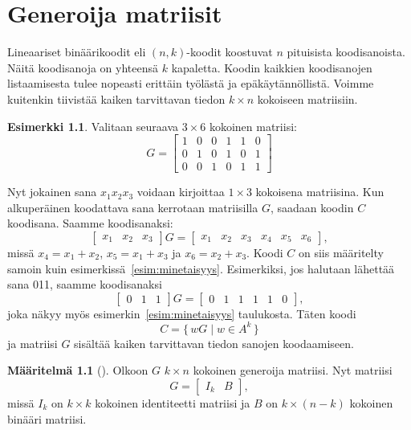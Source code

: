 \documentclass[a4paper,12pt,leqno,oneside]{report} %
\theoremstyle{plain}
\theoremstyle{definition}
\newtheorem{maaritelma}{Määritelmä}[chapter]
\newtheorem{esimerkki}{Esimerkki}[chapter]
\theoremstyle{remark}
\numberwithin{equation}{chapter}
\begin{document}
    \chapter{Generoija matriisit}
    Lineaariset binäärikoodit eli $(n,k)$-koodit koostuvat $n$ pituisista koodisanoista. Näitä koodisanoja on yhteensä $k$ kapaletta. Koodin kaikkien koodisanojen listaamisesta tulee nopeasti erittäin työlästä ja epäkäytännöllistä. Voimme kuitenkin tiivistää kaiken tarvittavan tiedon $k \times n$ kokoiseen matriisiin.

    \begin{esimerkki}\label{esim:genmatrix}
        Valitaan seuraava $3 \times 6$ kokoinen matriisi:
        \[
            G=
            \begin{bmatrix}
                1 & 0 & 0 & 1 & 1 & 0\\
                0 & 1 & 0 & 1 & 0 & 1\\
                0 & 0 & 1 & 0 & 1 & 1
            \end{bmatrix}
        \]

        Nyt jokainen sana $x_1x_2x_3$ voidaan kirjoittaa $1 \times 3$ kokoisena matriisina. Kun alkuperäinen koodattava sana kerrotaan matriisilla $G$, saadaan koodin $C$ koodisana. Saamme koodisanaksi:
        \[
           \begin{bmatrix}
               x_1 & x_2 & x_3
            \end{bmatrix}G =
            \begin{bmatrix}
                x_1 & x_2 & x_3 & x_4 & x_5 & x_6
            \end{bmatrix},
        \]
        missä $x_4 = x_1 + x_2$, $x_5 = x_1 + x_3 $ ja $x_6 = x_2 + x_3$. Koodi $C$ on siis määritelty samoin kuin esimerkissä~\ref{esim:minetaisyys}. Esimerkiksi, jos halutaan lähettää sana 011, saamme koodisanaksi
        \[
           \begin{bmatrix}
               0 & 1 & 1
            \end{bmatrix}
            G =
            \begin{bmatrix}
                0 & 1 & 1 & 1 & 1 & 0
            \end{bmatrix},
        \]
        joka näkyy myös esimerkin~\ref{esim:minetaisyys} taulukosta. Täten koodi
        \[
            C = \{\,wG \mid w \in A^k\,\}
        \]
        ja matriisi $G$ sisältää kaiken tarvittavan tiedon sanojen koodaamiseen.
    \end{esimerkki}

    \begin{maaritelma}[{\cite[s.~497]{PA}}]\label{maar:generoija}
        Olkoon $G$ $k \times n$ kokoinen generoija matriisi. Nyt matriisi 
        \[
            G = 
            \begin{bmatrix}
                I_k & B 
            \end{bmatrix},
        \]
        missä $I_k$ on $k \times k$ kokoinen identiteetti matriisi ja $B$ on $k \times (n-k)$ kokoinen binääri matriisi. 
        
    \end{maaritelma}
\end{document}
